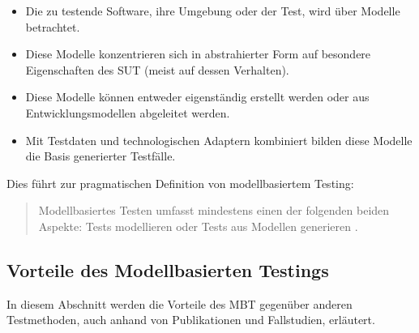\begin{itemize}
\item Die zu testende Software, ihre Umgebung oder der Test, wird über Modelle betrachtet.
\item Diese Modelle konzentrieren sich in abstrahierter Form auf besondere Eigenschaften des \Gls{SUT} (meist auf dessen Verhalten).
\item Diese Modelle können entweder eigenständig erstellt werden oder aus Entwicklungsmodellen abgeleitet werden.
\item Mit Testdaten und technologischen Adaptern kombiniert bilden diese Modelle die Basis generierter Testfälle.
\end{itemize}

Dies führt zur pragmatischen Definition von modellbasiertem Testing:

\begin{quote}
Modellbasiertes Testen umfasst mindestens einen der folgenden beiden Aspekte: Tests modellieren oder Tests aus Modellen generieren \cite{rossner_basiswissen_2010}.
\end{quote}

\subsection{Vorteile des Modellbasierten Testings}
\label{sec:mbt_vorteile}
In diesem Abschnitt werden die Vorteile des \Gls{MBT} gegenüber anderen Testmethoden, auch anhand von Publikationen und Fallstudien, erläutert.


